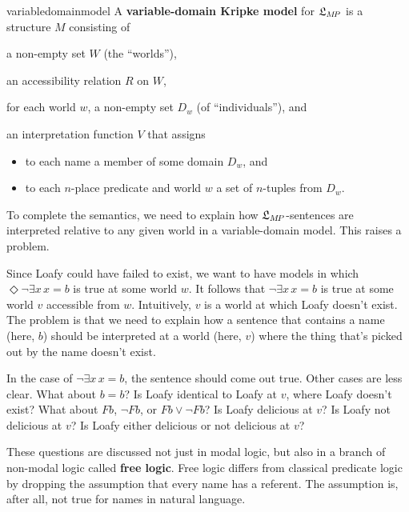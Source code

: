 \begin{definition}{}{variabledomainmodel}
  A \textbf{variable-domain Kripke model} for $\mathfrak{L}_{M\!P}$ is a structure $M$
  consisting of%
  \medskip
  \begin{compactenum}
  \item a non-empty set $W$ (the ``worlds''),
  \item an accessibility relation $R$ on $W$,
  \item for each world $w$, a non-empty set $D_w$ (of ``individuals''), and
  \item an interpretation function $V$ that assigns
    \vspace{-1mm}
    \begin{itemize}
      \itemsep-1mm
      \item to each name a member of some domain $D_w$, and
      \item to each $n$-place predicate and world $w$ a set of $n$-tuples from
            $D_w$.
    \end{itemize}
  \end{compactenum}
\end{definition}

To complete the semantics, we need to explain how $\mathfrak{L}_{M\!P}$-sentences are
interpreted relative to any given world in a variable-domain model. This raises
a problem.

Since Loafy could have failed to exist, we want to have models in which
$\Diamond \neg \exists x\, {x\!=\!b}$ is true at some world $w$. It follows that
$\neg \exists x\, x\!=\!b$ is true at some world $v$ accessible from $w$.
Intuitively, $v$ is a world at which Loafy doesn't exist. The problem is that we
need to explain how a sentence that contains a name (here, $b$) should be
interpreted at a world (here, $v$) where the thing that's picked out by the name
doesn't exist.

In the case of $\neg \exists x\, x\!=\!b$, the sentence should come out true.
Other cases are less clear. What about $b=b$? Is Loafy identical to Loafy at
$v$, where Loafy doesn't exist? What about $Fb$, $\neg Fb$, or
$Fb \lor \neg Fb$? Is Loafy delicious at $v$? Is Loafy not delicious at $v$? Is
Loafy either delicious or not delicious at $v$?

These questions are discussed not just in modal logic, but also in a branch of
non-modal logic called \textbf{free logic}. Free logic differs from classical
predicate logic by dropping the assumption that every name has a referent. The
assumption is, after all, not true for names in natural language.

